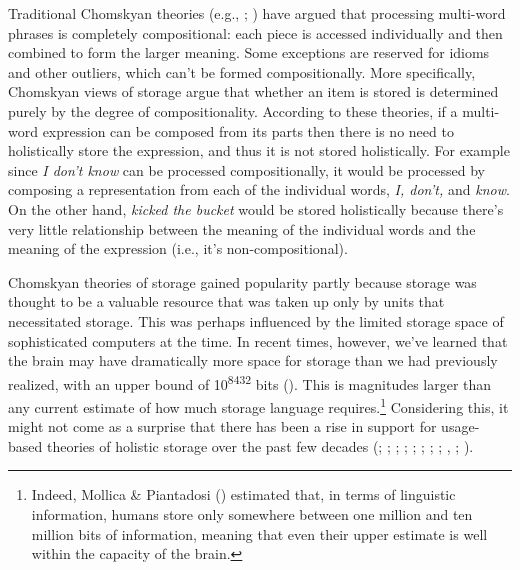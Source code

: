 \documentclass[
  12pt,
  letterpaper,
]{scrreprt}
\begin{document}
Traditional Chomskyan theories (e.g.,
;
) have argued that
processing multi-word phrases is completely compositional: each piece is
accessed individually and then combined to form the larger meaning. Some
exceptions are reserved for idioms and other outliers, which can't be
formed compositionally. More specifically, Chomskyan views of storage
argue that whether an item is stored is determined purely by the degree
of compositionality. According to these theories, if a multi-word
expression can be composed from its parts then there is no need to
holistically store the expression, and thus it is not stored
holistically. For example since \emph{I don't know} can be processed
compositionally, it would be processed by composing a representation
from each of the individual words, \emph{I, don't,} and \emph{know}. On
the other hand, \emph{kicked the bucket} would be stored holistically
because there's very little relationship between the meaning of the
individual words and the meaning of the expression (i.e., it's
non-compositional).

Chomskyan theories of storage gained popularity partly because storage
was thought to be a valuable resource that was taken up only by units
that necessitated storage. This was perhaps influenced by the limited
storage space of sophisticated computers at the time. In recent times,
however, we've learned that the brain may have dramatically more space
for storage than we had previously realized, with an upper bound of
10\textsuperscript{8432} bits
().
This is magnitudes larger than any current estimate of how much storage
language requires.\footnote{Indeed, Mollica \& Piantadosi
  () estimated that,
  in terms of linguistic information, humans store only somewhere
  between one million and ten million bits of information, meaning that
  even their upper estimate is well within the capacity of the brain.}
Considering this, it might not come as a surprise that there has been a
rise in support for usage-based theories of holistic storage over the
past few decades
(;
;
; ; ; ;
; ;
, ;
).
\end{document}
